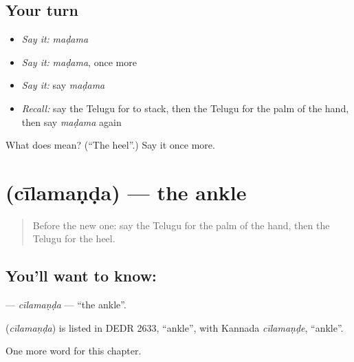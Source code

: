 \subsection*{Your turn}
\begin{itemize}
\raggedright
  \item \emph{Say it:} \emph{maḍama}
  \item \emph{Say it:} \emph{maḍama}, once more
  \item \emph{Say it:} say \emph{maḍama}
  \item \emph{Recall:} say the Telugu for to stack, then the Telugu for the palm of the hand, then say \emph{maḍama} again
\end{itemize}

\begin{tcolorbox}[breakable,colback=teal!4,colframe=teal!35!black,title={Before you move on}]
What does  mean? (\textquotedblleft{}The heel\textquotedblright{}.) Say it once more.
\end{tcolorbox}
\section[\texorpdfstring{\te{చీలమండ} (cīlamaṇḍa)}{చీలమండ (cīlamaṇḍa)}]{ (cīlamaṇḍa) — the ankle}

\label{lesson:TE-C250-cilamanda}



\begin{quote}
Before the new one: say the Telugu for the palm of the hand, then the Telugu for the heel.
\end{quote}

\subsection*{You'll want to know: }
\textbf{} — \emph{cīlamaṇḍa} — \textquotedblleft{}the ankle\textquotedblright{}.

\begin{cousinweb}
\textbf{} (\emph{cīlamaṇḍa}) is listed in DEDR 2633, \textquotedblleft{}ankle\textquotedblright{}, with Kannada \emph{cīlamaṇḍe}, \textquotedblleft{}ankle\textquotedblright{}.
\end{cousinweb}

\begin{grammarlens}[title={What you've built}]
One more word for this chapter.
\end{grammarlens}

